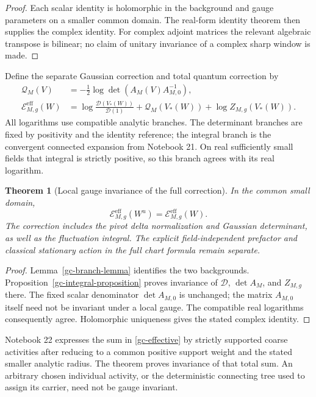 \documentclass[11pt]{article}
\newtheorem{theorem}{Theorem}[section]
\theoremstyle{remark}
\begin{document}
\begin{proof}
Each scalar identity is holomorphic in the background and gauge
parameters on a smaller common domain. The real-form identity
theorem then supplies the complex identity. For complex adjoint
matrices the relevant algebraic transpose is bilinear; no claim
of unitary invariance of a complex sharp window is made.
\end{proof}

Define the separate Gaussian correction and total quantum correction by
\begin{align}
 \mathcal Q_M(V)&=-\tfrac12\log
                \det\!\left(A_M(V)A_{M,0}^{-1}\right),       \label{gc-q}\\
 \mathcal E_{M,g}^{\mathrm{eff}}(W)
   &=\log\frac{\mathcal D(V_*(W))}{\mathcal D(1)}
        +\mathcal Q_M(V_*(W))
        +\log Z_{M,g}(V_*(W)).                             \label{gc-effective}
\end{align}
All logarithms use compatible analytic branches. The determinant
branches are fixed by positivity and the identity reference;
the integral branch is the convergent connected expansion
from Notebook 21. On real sufficiently small fields that
integral is strictly positive, so this branch agrees with its
real logarithm.

\begin{theorem}[Local gauge invariance of the full correction]
\label{gc-effective-theorem}
In the common small domain,
\begin{equation}\label{gc-effective-invariance}
 \mathcal E_{M,g}^{\mathrm{eff}}(W^u)
                      =\mathcal E_{M,g}^{\mathrm{eff}}(W).
\end{equation}
The correction includes the pivot delta normalization and Gaussian
determinant, as well as the fluctuation integral. The explicit
field-independent prefactor and classical stationary action in the
full chart formula remain separate.
\end{theorem}
\begin{proof}
Lemma~\ref{gc-branch-lemma} identifies the two backgrounds.
Proposition~\ref{gc-integral-proposition} proves invariance of
$\mathcal D$, $\det A_M$, and $Z_{M,g}$ there.
The fixed scalar denominator $\det A_{M,0}$ is unchanged;
the matrix $A_{M,0}$ itself need not be invariant under a local
gauge. The compatible real logarithms consequently agree.
Holomorphic uniqueness gives the stated complex identity.
\end{proof}

Notebook 22 expresses the sum in \eqref{gc-effective} by strictly
supported coarse activities after reducing to a common positive
support weight and the stated smaller analytic radius. The theorem
proves invariance of that total sum. An arbitrary chosen individual
activity, or the deterministic connecting tree used to assign its
carrier, need not be gauge invariant.
\end{document}
